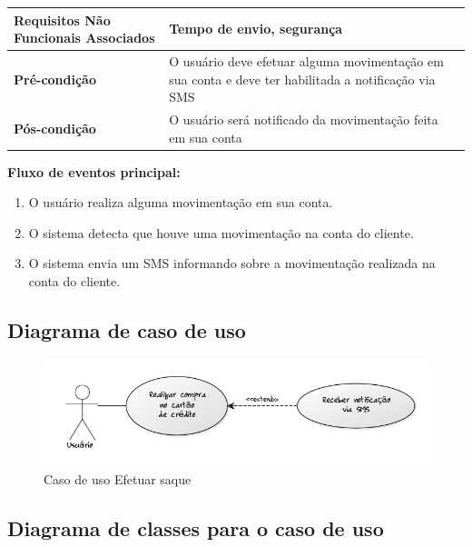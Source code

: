 \begin{table}[h]
  \centering
  \begin{tabular}{|p{4cm} | p{10cm} |}
      \hline
      \small{\textbf{Requisitos Não Funcionais Associados}}	& Tempo de envio, segurança	\\ \hline
      \small{\textbf{Pré-condição}}	&	O usuário deve efetuar alguma movimentação em sua conta e deve ter habilitada a notificação via SMS	\\ \hline
      \small{\textbf{Pós-condição}}	&	O usuário será notificado da movimentação feita em sua conta	\\ \hline
    \end{tabular}
\end{table}

\textbf{Fluxo de eventos principal:}

\begin{enumerate}
  \item O usuário realiza alguma movimentação em sua conta.
  \item O sistema detecta que houve uma movimentação na conta do cliente.
  \item O sistema envia um SMS informando sobre a movimentação realizada na conta do cliente.
\end{enumerate}

\subsection{Diagrama de caso de uso}

\begin{figure}[!htb]
     \centering
     \includegraphics[scale=0.6]{diagramas/caso-de-uso/imagens/receberNotificacaoSms.png}
     \caption{Caso de uso Efetuar saque}
\end{figure}

\subsection{Diagrama de classes para o caso de uso}

